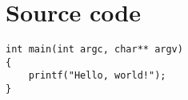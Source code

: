 \section{Source code}

\lstset{language=C++}
\begin{lstlisting}
int main(int argc, char** argv)
{
	printf("Hello, world!");
}
\end{lstlisting}